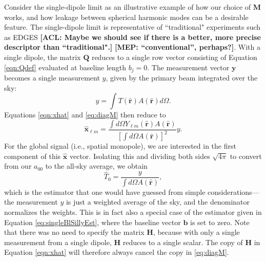 \documentclass[twolcolumn,apj,iop,numberedappendix]{emulateapj}
\newcommand{\Hmat}{\mathbf{H}}
\newcommand{\M}{\mathbf{M}}
\newcommand{\acl}[1]{{\color{red} \textbf{[ACL:  #1]}}}
\newcommand{\mep}[1]{{\color{applegreen} \textbf{[MEP:  #1]}}}
\begin{document}
Consider the single-dipole limit as an illustrative example of how our choice of $\M$ works, and how leakage between spherical harmonic modes can be a desirable feature. The single-dipole limit is representative of ``traditional" experiments such as EDGES \acl{Maybe we should see if there is a better, more precise descriptor than ``traditional".}\mep{``conventional'', perhaps?}. With a single dipole, the matrix $\mathbf{Q}$ reduces to a single row vector consisting of Equation \eqref{eqn:Qdef} evaluated at baseline length $b_j=0$. The measurement vector $\mathbf{y}$ becomes a single measurement $y$, given by the primary beam integrated over the sky:
\begin{equation}
y = \int T(\mathbf{\hat{r}}) A(\mathbf{\hat{r}}) d\Omega.
\end{equation}
Equations \eqref{eqn:xhat} and \eqref{eq:diagM} then reduce to
\begin{equation}
\mathbf{\hat{x}}_{\ell m} = \frac{\int d\Omega Y_{\ell m} (\mathbf{\hat{r}}) A(\mathbf{\hat{r}})}{\left[ \int d\Omega A(\mathbf{\hat{r}}) \right]^2} y.
\end{equation}
For the global signal (i.e., spatial monopole), we are interested in the first component of this $\mathbf{\hat{x}}$ vector. Isolating this and dividing both sides $\sqrt{4\pi}$ to convert from our $a_{00}$ to the all-sky average, we obtain
\begin{equation}
\label{eq:singleElementExtraction}
\widehat{T}_0 = \frac{y}{ \int d\Omega A(\mathbf{\hat{r}}) },
\end{equation}
which is the estimator that one would have guessed from simple considerations---the measurement $y$ is just a weighted average of the sky, and the denominator normalizes the weights. This is in fact also a special case of the estimator given in Equation \eqref{eq:singleBlSillyEst}, where the baseline vector $\mathbf{b}$ is set to zero. Note that there was no need to specify the matrix $\Hmat$, because with only a single measurement from a single dipole, $\Hmat$ reduces to a single scalar. The copy of $\Hmat$ in Equation \eqref{eqn:xhat} will therefore always cancel the copy in \eqref{eq:diagM}.
%
\end{document}
